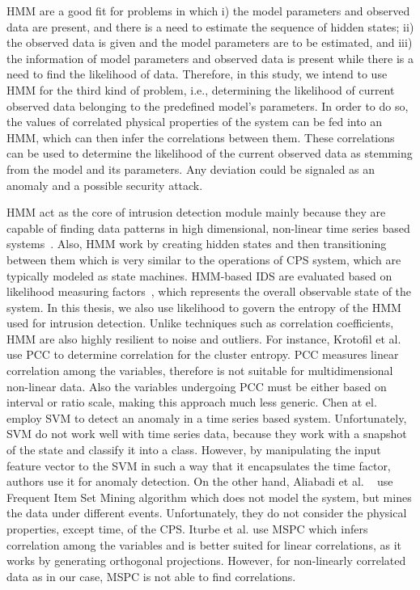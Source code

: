 \ac{HMM} are a good fit for problems in which i) the model parameters and observed data are present, and there is a need to estimate the sequence of hidden states; ii) the observed data is given and the model parameters are to be estimated, and iii) the information of model parameters and observed data is present while there is a need to find the likelihood of data. Therefore, in this study, we intend to use \ac{HMM} for the third kind of problem, i.e., determining the likelihood of current observed data belonging to the predefined model's parameters. In order to do so, the values of correlated physical properties of the system can be fed into an \ac{HMM}, which can then infer the correlations between them. These correlations can be used to determine the likelihood of the current observed data as stemming from the model and its parameters. Any deviation could be signaled as an anomaly and a possible security attack.

\ac{HMM} act as the core of intrusion detection module mainly because they are capable of finding data patterns in high dimensional, non-linear time series based systems~\cite{tan2008hidden}. Also, \ac{HMM} work by creating hidden states and then transitioning between them which is very similar to the operations of \ac{CPS} system, which are typically modeled as state machines. \ac{HMM}-based \ac{IDS} are  evaluated based on likelihood measuring factors~\cite{tan2008hidden, jadhav2011anomaly}, which represents the overall observable state of the system. In this thesis, we also use likelihood to govern the entropy of the \ac{HMM} used for intrusion detection. 
Unlike techniques such as correlation coefficients, \ac{HMM} are also highly resilient to noise and outliers. 
For instance, Krotofil et al.~\cite{krotofil2015process} use \acf{PCC} to determine correlation for the cluster entropy. \ac{PCC} measures linear correlation among the variables, therefore is not suitable for multidimensional non-linear data. Also the variables undergoing \ac{PCC} must be either based on interval or ratio scale, making this approach much less generic. Chen at el.  \cite{chen2018learning} employ \ac{SVM} to detect an anomaly in a time series based system. Unfortunately, \ac{SVM} do not work well with time series data, because they work with a snapshot of the state and classify it into a class. However, by manipulating the input feature vector to the \ac{SVM} in such a way that it encapsulates the time factor, authors use it for anomaly detection. On the other hand, Aliabadi et al. ~\cite{aliabadi2017artinali} use Frequent Item Set Mining algorithm which does not model the system, but mines the data under different events. Unfortunately, they do not consider the physical properties, except time, of the \ac{CPS}. Iturbe et al. \cite{iturbe2017feasibility} use \ac{MSPC} which infers correlation among the variables and is better suited for linear correlations, as it works by generating orthogonal projections. However, for non-linearly correlated data as in our case, \ac{MSPC} is not able to find correlations.


